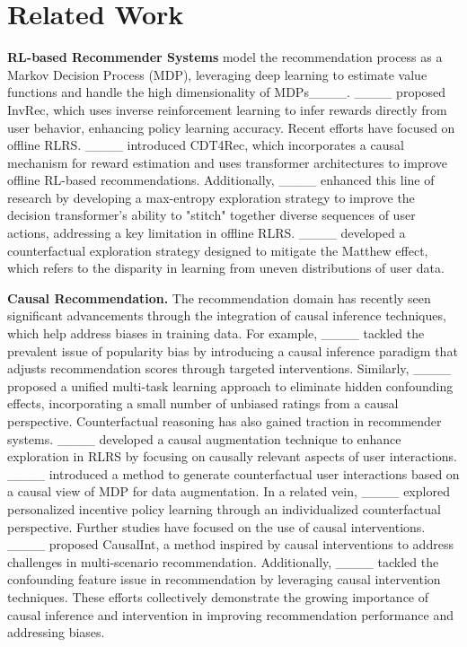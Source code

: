 \section{Related Work}
\vspace{1mm}\noindent\textbf{RL-based Recommender Systems}
model the recommendation process as a Markov Decision Process (MDP), leveraging deep learning to estimate value functions and handle the high dimensionality of MDPs____. ____ proposed InvRec, which uses inverse reinforcement learning to infer rewards directly from user behavior, enhancing policy learning accuracy. Recent efforts have focused on offline RLRS. ____ introduced CDT4Rec, which incorporates a causal mechanism for reward estimation and uses transformer architectures to improve offline RL-based recommendations. Additionally, ____ enhanced this line of research by developing a max-entropy exploration strategy to improve the decision transformer’s ability to "stitch" together diverse sequences of user actions, addressing a key limitation in offline RLRS. 
____ developed a counterfactual exploration strategy designed to mitigate the Matthew effect, which refers to the disparity in learning from uneven distributions of user data. 



\vspace{1mm}\noindent\textbf{Causal Recommendation.}
The recommendation domain has recently seen significant advancements through the integration of causal inference techniques, which help address biases in training data. For example, ____ tackled the prevalent issue of popularity bias by introducing a causal inference paradigm that adjusts recommendation scores through targeted interventions. Similarly, ____ proposed a unified multi-task learning approach to eliminate hidden confounding effects, incorporating a small number of unbiased ratings from a causal perspective.
Counterfactual reasoning has also gained traction in recommender systems. ____ developed a causal augmentation technique to enhance exploration in RLRS by focusing on causally relevant aspects of user interactions. ____ introduced a method to generate counterfactual user interactions based on a causal view of MDP for data augmentation. In a related vein, ____ explored personalized incentive policy learning through an individualized counterfactual perspective.
Further studies have focused on the use of causal interventions. ____ proposed CausalInt, a method inspired by causal interventions to address challenges in multi-scenario recommendation. Additionally, ____ tackled the confounding feature issue in recommendation by leveraging causal intervention techniques. These efforts collectively demonstrate the growing importance of causal inference and intervention in improving recommendation performance and addressing biases.